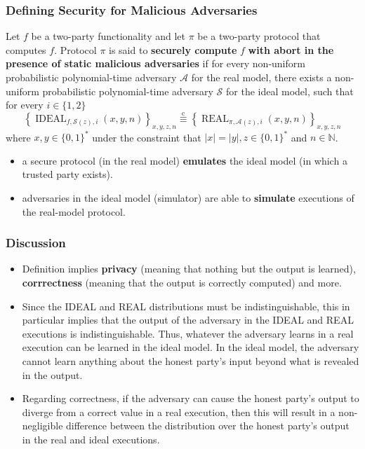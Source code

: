 \documentclass{beamer}
\begin{document}
    \begin{frame}
        \frametitle{Defining Security for Malicious Adversaries}
        \begin{definition}
            Let $f$ be a two-party functionality and let $\pi$ be a two-party protocol that computes $f .$ Protocol $\pi$ is said to \textbf{securely compute} $f$ \textbf{with abort in the presence of static malicious adversaries} if for every non-uniform probabilistic polynomial-time adversary $\mathcal{A}$ for the real model, there exists a non-uniform probabilistic polynomial-time adversary $\mathcal{S}$ for the ideal model, such that for every $i \in\{1,2\}$
        $$
        \left\{\operatorname{IDEAL}_{f, \mathcal{S}(z), i}(x, y, n)\right\}_{x, y, z, n} \stackrel{\mathrm{c}}{\equiv}\left\{\operatorname{REAL}_{\pi, \mathcal{A}(z), i}(x, y, n)\right\}_{x, y, z, n}
        $$
        where $x, y \in\{0,1\}^{*}$ under the constraint that $|x|=|y|, z \in\{0,1\}^{*}$ and $n \in \mathbb{N}$.
        \end{definition}

        \begin{itemize}
            \item a secure protocol (in the real model) \textbf{emulates} the ideal model (in which a trusted party exists). 
            \item adversaries in the ideal model (simulator) are able to \textbf{simulate} executions of the real-model protocol.
        \end{itemize}
        
    
        
    
    \end{frame}
    \begin{frame}
        \frametitle{Discussion}
        \begin{itemize}
            \item Definition implies \textbf{privacy} (meaning that nothing but the output is learned), \textbf{corrrectness} (meaning that the output is correctly computed) and more. 
            \item Since the IDEAL and REAL distributions must be indistinguishable, this in particular implies that the output of the adversary in the IDEAL and REAL executions is indistinguishable. Thus, whatever the adversary learns in a real execution can be learned in the ideal model. In the ideal model, the adversary cannot learn anything about the honest party's input beyond what is revealed in the output. 
            \item Regarding correctness, if the adversary can cause the honest party's output to diverge from a correct value in a real execution, then this will result in a non-negligible difference between the distribution over the honest party's output in the real and ideal executions. 
        \end{itemize}
    
        
    
    \end{frame}
\end{document}
